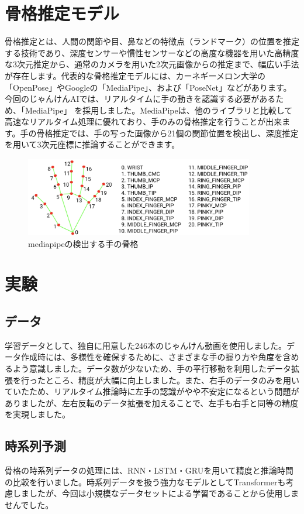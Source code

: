\section{骨格推定モデル}
骨格推定とは、人間の関節や目、鼻などの特徴点（ランドマーク）の位置を推定する技術であり、深度センサーや慣性センサーなどの高度な機器を用いた高精度な3次元推定から、通常のカメラを用いた2次元画像からの推定まで、幅広い手法が存在します。代表的な骨格推定モデルには、カーネギーメロン大学の「OpenPose」やGoogleの「MediaPipe」、および「PoseNet」などがあります。今回のじゃんけんAIでは、リアルタイムに手の動きを認識する必要があるため、「MediaPipe」 を採用しました。MediaPipeは、他のライブラリと比較して高速なリアルタイム処理に優れており、手のみの骨格推定を行うことが出来ます。手の骨格推定では、手の写った画像から21個の関節位置を検出し、深度推定を用いて3次元座標に推論することができます。
\begin{figure}[h]
  \centering
  \includegraphics[width=10cm]{no-lose-janken/fig/hand-landmarks.png}
  \caption{mediapipeの検出する手の骨格}
  \label{fig:hand_landmark}
\end{figure}

\section{実験}
\subsection{データ}
学習データとして、独自に用意した246本のじゃんけん動画を使用しました。データ作成時には、多様性を確保するために、さまざまな手の握り方や角度を含めるよう意識しました。データ数が少ないため、手の平行移動を利用したデータ拡張を行ったところ、精度が大幅に向上しました。また、右手のデータのみを用いていたため、リアルタイム推論時に左手の認識がやや不安定になるという問題がありましたが、左右反転のデータ拡張を加えることで、左手も右手と同等の精度を実現しました。

\subsection{時系列予測}
骨格の時系列データの処理には、RNN・LSTM・GRUを用いて精度と推論時間の比較を行いました。時系列データを扱う強力なモデルとしてTransformerも考慮しましたが、今回は小規模なデータセットによる学習であることから使用しませんでした。

